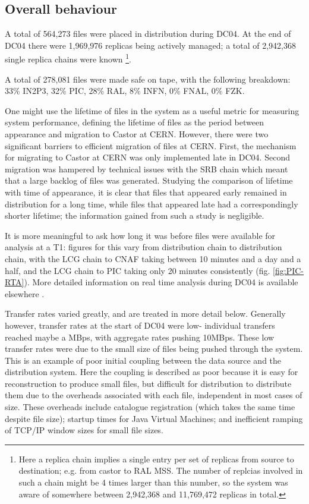 \documentclass{cmspaper}
\begin{document}
\subsection{Overall behaviour}
A total of 564,273 files were placed in distribution during DC04. At
the end of DC04 there were 1,969,976 replicas being actively managed;
a total of 2,942,368 single replica chains were known \footnote{Here a
replica chain implies a single entry per set of replicas from source
to destination; e.g. from castor to RAL MSS. The number of replcias
involved in such a chain might be 4 times larger than this number, so
the system was aware of somewhere between 2,942,368 and 11,769,472
replicas in total.}.

A total of 278,081 files were made safe on tape, with the following
breakdown: 33\% IN2P3, 32\% PIC, 28\% RAL, 8\% INFN, 0\% FNAL, 0\%
FZK.

One might use the lifetime of files in the system as a useful metric
for measuring system performance, defining the lifetime of files as
the period between appearance and migration to Castor at
CERN. However, there were two significant barriers to efficient
migration of files at CERN. First, the mechanism for migrating to
Castor at CERN was only implemented late in DC04. Second migration was
hampered by technical issues with the SRB chain which meant that a
large backlog of files was generated. Studying the comparison of
lifetime with time of appearance, it is clear that files that appeared
early remained in distribution for a long time, while files that
appeared late had a correspondingly shorter lifetime; the information
gained from such a study is negligible.

It is more meaningful to ask how long it was before files were
available for analysis at a T1: figures for this vary from
distribution chain to distribution chain, with the LCG chain to CNAF
taking between 10 minutes and a day and a half, and the LCG chain to
PIC taking only 20 minutes consistently (fig. \ref{fig:PIC-RTA}). More
detailed information on real time analysis during DC04 is available
elsewhere \cite{rtadoc}.

Transfer rates varied greatly, and are treated in more detail
below. Generally however, transfer rates at the start of DC04 were
low- individual transfers reached maybe a MBps, with aggregate rates
pushing 10MBps. These low transfer rates were due to the small size of
files being pushed through the system. This is an example of poor
initial coupling between the data source and the distribution
system. Here the coupling is described as poor because it is easy for
reconstruction to produce small files, but difficult for distribution
to distribute them due to the overheads associated with each file,
independent in most cases of size. These overheads include catalogue
registration (which takes the same time despite file size); startup
times for Java Virtual Machines; and inefficient ramping of TCP/IP
window sizes for small file sizes.
\end{document}
